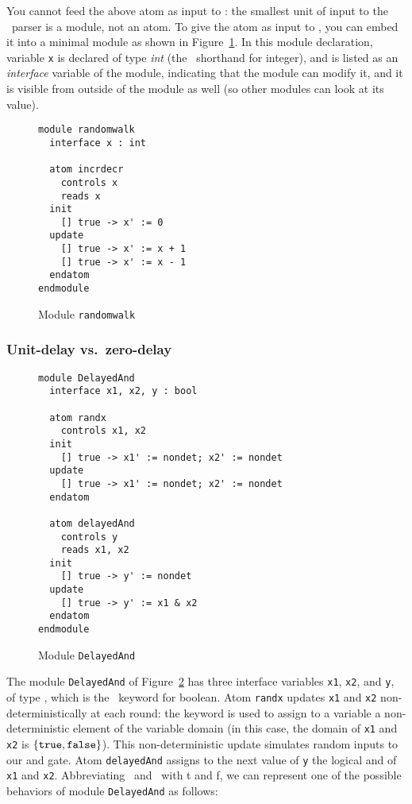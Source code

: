 You cannot feed the above atom as input to \mocha: the smallest unit of
input to the \mocha\  parser is a module, not an atom.  To give the atom
as input to \mocha, you can embed it into a minimal module as shown in
Figure~\ref{fig-randomwalk}. 
In this module declaration, variable {\tt x} is declared of type {\em
int\/} (the \mocha\  shorthand for integer), and is listed as an {\em
interface\/} variable of the module, indicating that the module can
modify it, and it is visible from outside of the module as well (so
other modules can look at its value). 

\begin{figure}
\begin{verbatim}
module randomwalk
  interface x : int 

  atom incrdecr
    controls x
    reads x 
  init
    [] true -> x' := 0
  update 
    [] true -> x' := x + 1
    [] true -> x' := x - 1
  endatom
endmodule 
\end{verbatim}
\caption{Module {\tt randomwalk}}
\label{fig-randomwalk}
\end{figure}

\subsubsection{Unit-delay vs.\ zero-delay}
\label{sec-unitdelay}

\begin{figure}
\begin{verbatim}
module DelayedAnd
  interface x1, x2, y : bool

  atom randx
    controls x1, x2
  init
    [] true -> x1' := nondet; x2' := nondet
  update 
    [] true -> x1' := nondet; x2' := nondet
  endatom

  atom delayedAnd
    controls y
    reads x1, x2
  init
    [] true -> y' := nondet
  update 
    [] true -> y' := x1 & x2
  endatom
endmodule 
\end{verbatim}
\caption{Module {\tt DelayedAnd}}
\label{fig-delayedand}
\end{figure}

The module {\tt DelayedAnd} of Figure~\ref{fig-delayedand} has three
interface variables {\tt x1}, {\tt x2}, and {\tt y}, of type \BOOL,
which is the \mocha\ keyword for boolean.  Atom {\tt randx} updates
{\tt x1} and {\tt x2} non-deterministically at each round: the keyword
\NONDET{} is used to assign to a variable a
non-deterministic element of the variable domain (in this case, the
domain of {\tt x1} and {\tt x2} is $\{{\tt true}, {\tt false}\}$).  This
non-deterministic update simulates random inputs to our {\sc and} gate.
Atom {\tt delayedAnd} assigns to the next value of {\tt y} the logical
{\sc and} of {\tt x1} and {\tt x2}.  Abbreviating \TRUE\ and \FALSE\
with {\sc t} and {\sc f}, we can represent one of the possible
behaviors of module {\tt DelayedAnd} as follows: 

